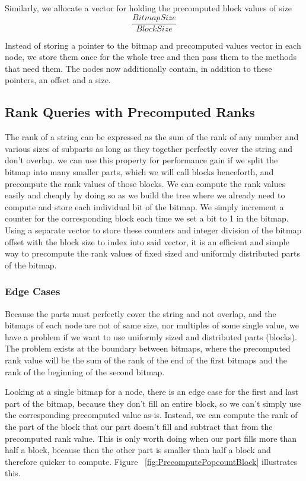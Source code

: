 Similarly, we allocate a vector for holding the precomputed block values of size
\[ \frac{BitmapSize}{BlockSize} \]

Instead of storing a pointer to the bitmap and precomputed values vector in each node, we store them once for the whole tree and then pass them to the methods that need them.
The nodes now additionally contain, in addition to these pointers, an offset and a size.


\subsection{Rank Queries with Precomputed Ranks}
The rank of a string can be expressed as the sum of the rank of any number and various sizes of subparts as long as they together perfectly cover the string and don't overlap.
we can use this property for performance gain if we split the bitmap into many smaller parts, which we will call blocks henceforth, and precompute the rank values of those blocks.
We can compute the rank values easily and cheaply by doing so as we build the tree where we already need to compute and store each individual bit of the bitmap.
We simply increment a counter for the corresponding block each time we set a bit to 1 in the bitmap.
Using a separate vector to store these counters and integer division of the bitmap offset with the block size to index into said vector, it is an efficient and simple way to precompute the rank values of fixed sized and uniformly distributed parts of the bitmap.


\subsubsection{Edge Cases}
\label{sec:rankQueriesWithPrecomputedRanksEdgeCases}
Because the parts must perfectly cover the string and not overlap, and the bitmaps of each node are not of same size, nor multiples of some single value, we have a problem if we want to use uniformly sized and distributed parts (blocks).
The problem exists at the boundary between bitmaps, where the precomputed rank value will be the sum of the rank of the end of the first bitmaps and the rank of the beginning of the second bitmap.

Looking at a single bitmap for a node, there is an edge case for the first and last part of the bitmap, because they don't fill an entire block, so we can't simply use the corresponding precomputed value as-is.
Instead, we can compute the rank of the part of the block that our part doesn't fill and subtract that from the precomputed rank value.
This is only worth doing when our part fills more than half a block, because then the other part is smaller than half a block and therefore quicker to compute.
Figure ~\ref{fig:PrecomputePopcountBlock} illustrates this.

